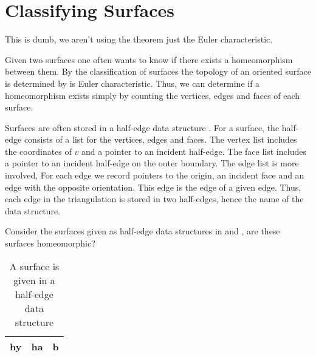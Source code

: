 \section{Classifying Surfaces}
\label{sec:classiify}

This is dumb, we aren't using the theorem
just the Euler characteristic.


Given two surfaces one often wants to know
if there exists a homeomorphism between them.
By the classification of surfaces the topology of
an oriented surface is determined by is Euler characteristic.
Thus, we can determine if a homeomorphism exists simply by
counting the vertices, edges and faces of each surface.

Surfaces are often stored in a half-edge data structure \cite{Marks,Crane:2013}.
For a surface, the half-edge consists of a list for the vertices, edges and faces.
The vertex list includes the coordinates of $v$ and a pointer to an incident half-edge.
The face list includes a pointer to an incident half-edge on the outer boundary.
The edge list is more involved, 
For each edge we record pointers to the origin, an incident face and 
an edge with the opposite orientation. This edge is the  edge of a given edge.
Thus, each edge in the triangulation is stored in two half-edges, hence the name
of the data structure.

Consider the surfaces given as half-edge data structures in  and ,
are these surfaces homeomorphic?

\begin{center}
\begin{table}
	\caption{\label{tab:torus}A surface is given in a half-edge data structure}
	\begin{tabular}{|c|c|c|}\label{tab:torus}
		
		hy & ha& b\\
		\hline
	\end{tabular}
\end{table}
\end{center}
